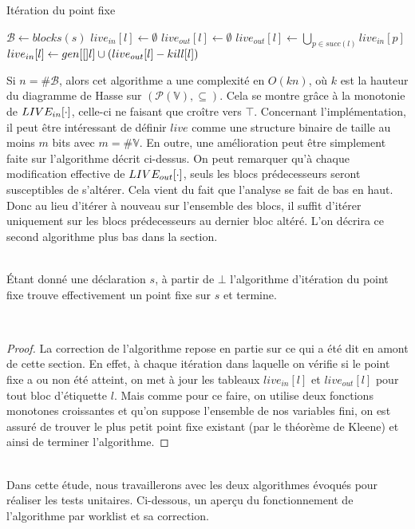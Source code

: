 \documentclass[a4paper, 12pt]{article}
\begin{document}
\begin{algorithm}[H]
	\caption{Itération du point fixe}
	\begin{algorithmic}
		\State $\mathcal{B} \leftarrow blocks(s)$
		\State $live_{in}[l] \leftarrow \emptyset$
		\State $live_{out}[l] \leftarrow \emptyset$
		\EndFor
		\State $live_{out}[l] \leftarrow \bigcup\limits_{p\in succ(l)} live_{in}[p]$
		\State $live_{in}[l] \leftarrow gen[[]l] \cup (live_{out}[l] - kill[l])$
		\EndFor
		\EndWhile
	\end{algorithmic}
\end{algorithm}
Si $n = \#\mathcal{B}$, alors cet algorithme a une complexité en $O(kn)$, où $k$ est la hauteur du diagramme
de Hasse sur $(\mathcal{P}(\mathbb{V}), \subseteq)$. Cela se montre grâce à la monotonie de $LIVE_{in}[\cdot]$, 
celle-ci ne faisant que croître vers $\top$.
Concernant l'implémentation, il peut être intéressant de définir $live$ comme une structure binaire de taille au
moins $m$ bits avec $m = \#\mathbb{V}$.
En outre, une amélioration peut être simplement faite sur l'algorithme décrit ci-dessus. On peut remarquer qu'à chaque 
modification effective de $LIVE_{out}[\cdot]$, seuls les blocs prédecesseurs seront susceptibles de s'altérer. Cela
vient du fait que l'analyse se fait de bas en haut. Donc
au lieu d'itérer à nouveau sur l'ensemble des blocs, il suffit d'itérer uniquement sur les blocs prédecesseurs au dernier
bloc altéré. L'on décrira ce second algorithme plus bas dans la section.
\\
\\
\begin{lemma}
	Étant donné une déclaration $s$, à partir de $\bot$ l'algorithme d'itération du point fixe trouve effectivement
	un point fixe sur $s$ et termine.
\end{lemma}
\\
\begin{proof}
La correction de l'algorithme repose en partie sur ce qui a été dit en amont de cette section.
En effet, à chaque itération dans laquelle on vérifie si le point fixe a ou non été atteint, on met à jour les
tableaux $live_{in}[l]$ et $live_{out}[l]$ pour tout bloc d'étiquette $l$. Mais comme pour ce faire, on utilise deux fonctions monotones croissantes et qu'on suppose
l'ensemble de nos variables fini, on est assuré de trouver le plus petit point fixe existant (par le théorème de Kleene) et ainsi de terminer l'algorithme.
\end{proof}
\\
Dans cette étude, nous travaillerons avec les deux algorithmes évoqués pour réaliser les tests unitaires. Ci-dessous, un aperçu du fonctionnement
de l'algorithme par worklist et sa correction.
\end{document}
